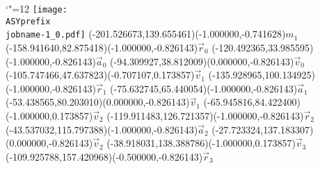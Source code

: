\setlength{\unitlength}{1pt}
\makeatletter%
\let\ASYencoding\f@encoding%
\let\ASYfamily\f@family%
\let\ASYseries\f@series%
\let\ASYshape\f@shape%
\makeatother%
{\catcode`"=12%
\texttt{[image: \\ASYprefix\\jobname-1\_0.pdf]}%
}%
\color{ASYcolor}
\fontsize{12.000000}{14.400000}\selectfont
\usefont{\ASYencoding}{\ASYfamily}{\ASYseries}{\ASYshape}%
\ASYalign(-201.526673,139.655461)(-1.000000,-0.741628){$m_1$}%
\color{ASYcolor}
\fontsize{12.000000}{14.400000}\selectfont
\ASYalign(-158.941640,82.875418)(-1.000000,-0.826143){$\vec{r}_0$}%
\color{ASYcolor}
\fontsize{12.000000}{14.400000}\selectfont
\ASYalign(-120.492365,33.985595)(-1.000000,-0.826143){$\vec{a}_0$}%
\color{ASYcolor}
\fontsize{12.000000}{14.400000}\selectfont
\ASYalign(-94.309927,38.812009)(0.000000,-0.826143){$\vec{v}_0$}%
\color{ASYcolor}
\fontsize{12.000000}{14.400000}\selectfont
\ASYalign(-105.747466,47.637823)(-0.707107,0.173857){$\vec{v}_1$}%
\color{ASYcolor}
\fontsize{12.000000}{14.400000}\selectfont
\ASYalign(-135.928965,100.134925)(-1.000000,-0.826143){$\vec{r}_1$}%
\color{ASYcolor}
\fontsize{12.000000}{14.400000}\selectfont
\ASYalign(-75.632745,65.440054)(-1.000000,-0.826143){$\vec{a}_1$}%
\color{ASYcolor}
\fontsize{12.000000}{14.400000}\selectfont
\ASYalign(-53.438565,80.203010)(0.000000,-0.826143){$\vec{v}_1$}%
\color{ASYcolor}
\fontsize{12.000000}{14.400000}\selectfont
\ASYalign(-65.945816,84.422400)(-1.000000,0.173857){$\vec{v}_2$}%
\color{ASYcolor}
\fontsize{12.000000}{14.400000}\selectfont
\ASYalign(-119.911483,126.721357)(-1.000000,-0.826143){$\vec{r}_2$}%
\color{ASYcolor}
\fontsize{12.000000}{14.400000}\selectfont
\ASYalign(-43.537032,115.797388)(-1.000000,-0.826143){$\vec{a}_2$}%
\color{ASYcolor}
\fontsize{12.000000}{14.400000}\selectfont
\ASYalign(-27.723324,137.183307)(0.000000,-0.826143){$\vec{v}_2$}%
\color{ASYcolor}
\fontsize{12.000000}{14.400000}\selectfont
\ASYalign(-38.918031,138.388786)(-1.000000,0.173857){$\vec{v}_3$}%
\color{ASYcolor}
\fontsize{12.000000}{14.400000}\selectfont
\ASYalign(-109.925788,157.420968)(-0.500000,-0.826143){$\vec{r}_3$}%
